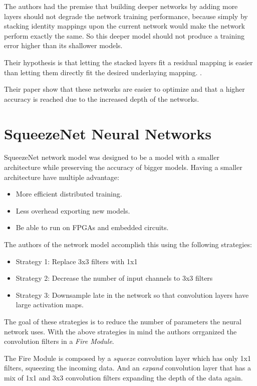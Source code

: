 The authors had the premise that building deeper networks by adding more layers should not degrade the network training performance, because simply by stacking identity mappings upon the current network would make the network perform exactly the same. So this deeper model should not produce a training error higher than its shallower models. 

Their hypothesis is that letting the stacked layers fit a residual mapping is easier than letting them directly fit the desired underlaying mapping. .

Their paper \cite{He2016} show that these networks are easier to optimize and that a higher accuracy is reached due to the increased depth of the networks.


\section{SqueezeNet Neural Networks}

SqueezeNet network model was designed to be a model with a smaller architecture while preserving the accuracy of bigger models. Having a smaller architecture have multiple advantage:

\begin{itemize}

\item More efficient distributed training.
\item Less overhead exporting new models.
\item Be able to run on FPGAs and embedded circuits.

\end{itemize}

The authors of the network model accomplish this using the following strategies:

\begin{itemize}
\item Strategy 1: Replace 3x3 filters with 1x1 
\item Strategy 2: Decrease the number of input channels to 3x3 filters
\item Strategy 3: Downsample late in the network so that convolution layers have large activation maps.
\end{itemize}

The goal of these strategies is to reduce the number of parameters the neural network uses. With the above strategies in mind the authors orrganized the convolution filters in a \emph{Fire Module}.

The Fire Module is composed by a \emph{squeeze} convolution layer which has only 1x1 filters, squeezing the incoming data.
And an \emph{expand} convolution layer that has a mix of 1x1 and 3x3 convolution filters expanding the depth of the data again.





